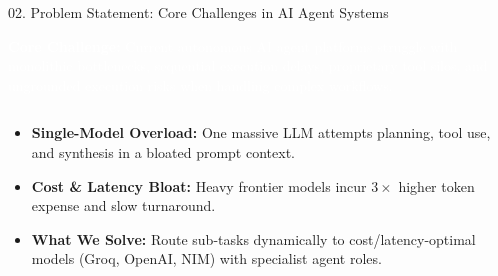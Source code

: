 \documentclass[aspectratio=169,10pt]{beamer}
\begin{document}
\begin{frame}[t]{02. Problem Statement: Core Challenges in AI Agent Systems}
\vspace{-0.30em}

\centering
\begin{tcolorbox}[
  enhanced, colback=lavenderDark!90, colframe=lavenderDark, arc=3pt,
  boxrule=0.5pt, width=0.98\linewidth, top=2.8pt, bottom=2.8pt, left=8pt, right=8pt,
  halign=center
]
  \textcolor{white}{\fontsize{6.8}{8.4}\selectfont\sffamily
  \textbf{Core Challenge:} Current autonomous AI agent platforms struggle with monolithic bottlenecks, sequential execution delays, proprietary tool silos, and ungrounded execution risks when handling complex workflows.}
\end{tcolorbox}

\vspace{-0.35em}

\begin{columns}[T]
  \begin{column}{0.485\textwidth}
    \begin{tcolorbox}[
      enhanced, arc=3pt, colframe=red!65!black, colback=white,
      title={\scriptsize\bfseries\color{white}\faExclamationCircle\ 1. Monolithic LLM Bottleneck \& High Cost},
      colbacktitle=red!65!black, boxrule=0.6pt,
      left=4pt, right=4pt, top=2.0pt, bottom=2.0pt
    ]
    \fontsize{5.5}{6.7}\selectfont
    \begin{itemize}\setlength{\itemsep}{1.2pt}
      \item \textbf{Single-Model Overload:} One massive LLM attempts planning, tool use, and synthesis in a bloated prompt context.
      \item \textbf{Cost \& Latency Bloat:} Heavy frontier models incur $3\times$ higher token expense and slow turnaround.
      \item \textbf{\color{red!75!black}What We Solve:} Route sub-tasks dynamically to cost/latency-optimal models (Groq, OpenAI, NIM) with specialist agent roles.
    \end{itemize}
    \end{tcolorbox}

    \vspace{-0.30em}


\end{column}
\end{columns}
\end{frame}
\end{document}
